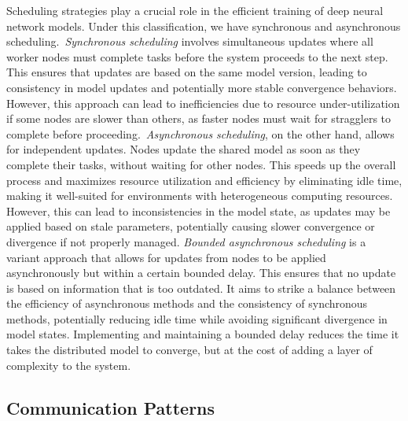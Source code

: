 \documentclass[11pt]{article}
\begin{document}
Scheduling strategies play a crucial role in the efficient training of deep neural network models. Under this classification, we have synchronous and asynchronous scheduling.\ \textit{Synchronous scheduling} involves simultaneous updates where all worker nodes must complete tasks before the system proceeds to the next step. This ensures that updates are based on the same model version, leading to consistency in model updates and potentially more stable convergence behaviors. However, this approach can lead to inefficiencies due to resource under-utilization if some nodes are slower than others, as faster nodes must wait for stragglers to complete before proceeding.\ \textit{Asynchronous scheduling}, on the other hand, allows for independent updates. Nodes update the shared model as soon as they complete their tasks, without waiting for other nodes. This speeds up the overall process and maximizes resource utilization and efficiency by eliminating idle time, making it well-suited for environments with heterogeneous computing resources. However, this can lead to inconsistencies in the model state, as updates may be applied based on stale parameters, potentially causing slower convergence or divergence if not properly managed. 
\textit{Bounded asynchronous scheduling} is a variant approach that allows for updates from nodes to be applied asynchronously but within a certain bounded delay. This ensures that no update is based on information that is too outdated. It aims to strike a balance between the efficiency of asynchronous methods and the consistency of synchronous methods, potentially reducing idle time while avoiding significant divergence in model states. Implementing and maintaining a bounded delay reduces the time it takes the distributed model to converge, but at the cost of adding a layer of complexity to the system.


\subsection*{Communication Patterns}
\end{document}
